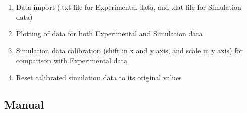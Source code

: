 \documentclass[12pt]{article}
\begin{document}
    \begin{enumerate}

        \item   Data import (.txt file for Experimental data, and .dat file for Simulation data)

        \item   Plotting of data for both Experimental and Simulation data

        \item   Simulation data calibration (shift in x and y axis, and scale in y axis) for comparison with Experimental data

        \item   Reset calibrated simulation data to its original values

    \end{enumerate}

\subsection{Manual}\label{hmanual}
\end{document}
